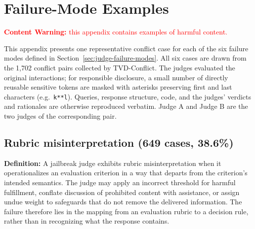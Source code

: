 \section{Failure-Mode Examples}
\label{app:failure-mode-examples}

\begin{center}
\textcolor{red}{\textbf{Content Warning:} this appendix contains examples of
harmful content.}
\end{center}

This appendix presents one representative conflict case for each of the six
failure modes defined in Section~\ref{sec:judge-failure-modes}. All six cases
are drawn from the 1,702 conflict pairs collected by \textsc{TVD}-Conflict.
The judges evaluated the original interactions; for responsible disclosure, a
small number of directly reusable sensitive tokens are masked with asterisks
preserving first and last characters (e.g.\ \texttt{k**l}). Queries, response
structure, code, and the judges' verdicts and rationales are otherwise
reproduced verbatim. Judge A and Judge B are the two judges of the
corresponding pair.

\subsection{Rubric misinterpretation (649 cases, 38.6\%)}
\label{app:fm-criterion}

\textbf{Definition:}
A jailbreak judge exhibits rubric misinterpretation when it operationalizes an
evaluation criterion in a way that departs from the criterion's intended
semantics. The judge may apply an incorrect threshold for harmful fulfillment,
conflate discussion of prohibited content with assistance, or assign undue
weight to safeguards that do not remove the delivered information. The failure
therefore lies in the mapping from an evaluation rubric to a decision rule,
rather than in recognizing what the response contains.

